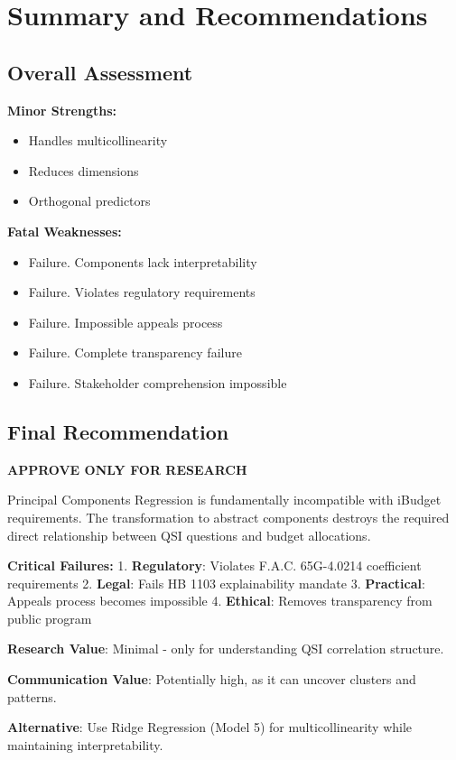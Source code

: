 \section{Summary and Recommendations}

\subsection{Overall Assessment}

\textbf{Minor Strengths:}
\begin{itemize}
    \item Handles multicollinearity
    \item Reduces dimensions
    \item Orthogonal predictors
\end{itemize}

\textbf{Fatal Weaknesses:}
\begin{itemize}
    \item Failure.  Components lack interpretability
    \item Failure.  Violates regulatory requirements
    \item Failure.  Impossible appeals process
    \item Failure.  Complete transparency failure
    \item Failure.  Stakeholder comprehension impossible
\end{itemize}

\subsection{Final Recommendation}

\textbf{APPROVE ONLY FOR RESEARCH}

Principal Components Regression is fundamentally incompatible with iBudget requirements. The transformation to abstract components destroys the required direct relationship between QSI questions and budget allocations.

\textbf{Critical Failures:}
1. \textbf{Regulatory}: Violates F.A.C. 65G-4.0214 coefficient requirements
2. \textbf{Legal}: Fails HB 1103 explainability mandate
3. \textbf{Practical}: Appeals process becomes impossible
4. \textbf{Ethical}: Removes transparency from public program

\textbf{Research Value}: Minimal - only for understanding QSI correlation structure.

\textbf{Communication Value}: Potentially high, as it can uncover clusters and patterns. 

\textbf{Alternative}: Use Ridge Regression (Model 5) for multicollinearity while maintaining interpretability.
